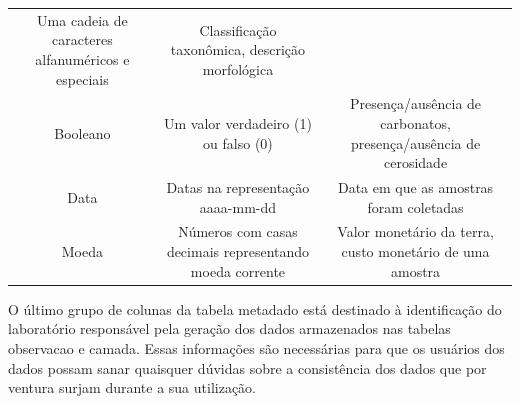 \documentclass[a4paper,dvipsnames]{tufte-book}
\begin{document}
\begin{longtable}[]{@{}ccc@{}}
\begin{minipage}[t]{0.39\columnwidth}
Uma cadeia de caracteres alfanuméricos e especiais\strut
\end{minipage} & \begin{minipage}[t]{0.39\columnwidth}\centering\strut
Classificação taxonômica, descrição morfológica\strut
\end{minipage}\tabularnewline
\begin{minipage}[t]{0.13\columnwidth}\centering\strut
Booleano\strut
\end{minipage} & \begin{minipage}[t]{0.39\columnwidth}\centering\strut
Um valor verdadeiro (1) ou falso (0)\strut
\end{minipage} & \begin{minipage}[t]{0.39\columnwidth}\centering\strut
Presença/ausência de carbonatos, presença/ausência de cerosidade\strut
\end{minipage}\tabularnewline
\begin{minipage}[t]{0.13\columnwidth}\centering\strut
Data\strut
\end{minipage} & \begin{minipage}[t]{0.39\columnwidth}\centering\strut
Datas na representação aaaa-mm-dd\strut
\end{minipage} & \begin{minipage}[t]{0.39\columnwidth}\centering\strut
Data em que as amostras foram coletadas\strut
\end{minipage}\tabularnewline
\begin{minipage}[t]{0.13\columnwidth}\centering\strut
Moeda\strut
\end{minipage} & \begin{minipage}[t]{0.39\columnwidth}\centering\strut
Números com casas decimais representando moeda corrente\strut
\end{minipage} & \begin{minipage}[t]{0.39\columnwidth}\centering\strut
Valor monetário da terra, custo monetário de uma amostra\strut
\end{minipage}\tabularnewline
\bottomrule
\end{longtable}

O último grupo de colunas da tabela metadado está destinado à
identificação do laboratório responsável pela geração dos dados
armazenados nas tabelas observacao e camada. Essas informações são
necessárias para que os usuários dos dados possam sanar quaisquer
dúvidas sobre a consistência dos dados que por ventura surjam durante a
sua utilização.
\end{document}
